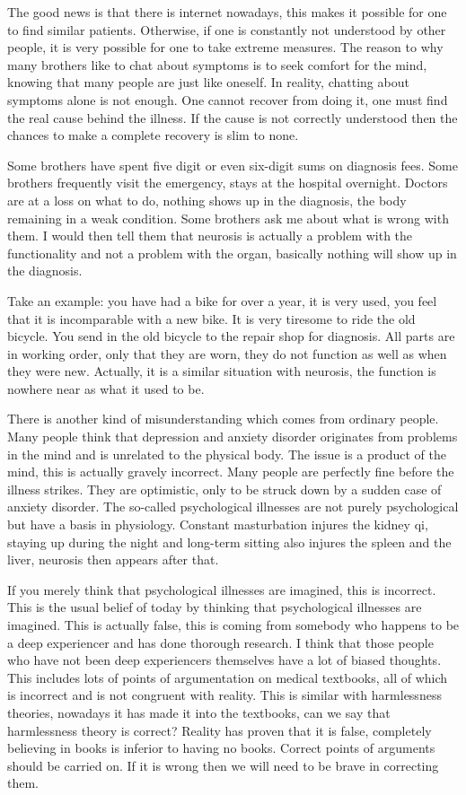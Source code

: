 \documentclass[
]{book}
\begin{document}
The good news is that there is internet nowadays, this makes it possible for one to find similar patients. Otherwise, if one is constantly not understood by other people, it is very possible for one to take extreme measures. The reason to why many brothers like to chat about symptoms is to seek comfort for the mind, knowing that many people are just like oneself. In reality, chatting about symptoms alone is not enough. One cannot recover from doing it, one must find the real cause behind the illness. If the cause is not correctly understood then the chances to make a complete recovery is slim to none.

Some brothers have spent five digit or even six-digit sums on diagnosis fees. Some brothers frequently visit the emergency, stays at the hospital overnight. Doctors are at a loss on what to do, nothing shows up in the diagnosis, the body remaining in a weak condition. Some brothers ask me about what is wrong with them. I would then tell them that neurosis is actually a problem with the functionality and not a problem with the organ, basically nothing will show up in the diagnosis.

Take an example: you have had a bike for over a year, it is very used, you feel that it is incomparable with a new bike. It is very tiresome to ride the old bicycle. You send in the old bicycle to the repair shop for diagnosis. All parts are in working order, only that they are worn, they do not function as well as when they were new. Actually, it is a similar situation with neurosis, the function is nowhere near as what it used to be.

There is another kind of misunderstanding which comes from ordinary people. Many people think that depression and anxiety disorder originates from problems in the mind and is unrelated to the physical body. The issue is a product of the mind, this is actually gravely incorrect. Many people are perfectly fine before the illness strikes. They are optimistic, only to be struck down by a sudden case of anxiety disorder. The so-called psychological illnesses are not purely psychological but have a basis in physiology. Constant masturbation injures the kidney qi, staying up during the night and long-term sitting also injures the spleen and the liver, neurosis then appears after that.

If you merely think that psychological illnesses are imagined, this is incorrect. This is the usual belief of today by thinking that psychological illnesses are imagined. This is actually false, this is coming from somebody who happens to be a deep experiencer and has done thorough research. I think that those people who have not been deep experiencers themselves have a lot of biased thoughts. This includes lots of points of argumentation on medical textbooks, all of which is incorrect and is not congruent with reality. This is similar with harmlessness theories, nowadays it has made it into the textbooks, can we say that harmlessness theory is correct? Reality has proven that it is false, completely believing in books is inferior to having no books. Correct points of arguments should be carried on. If it is wrong then we will need to be brave in correcting them.
\end{document}
